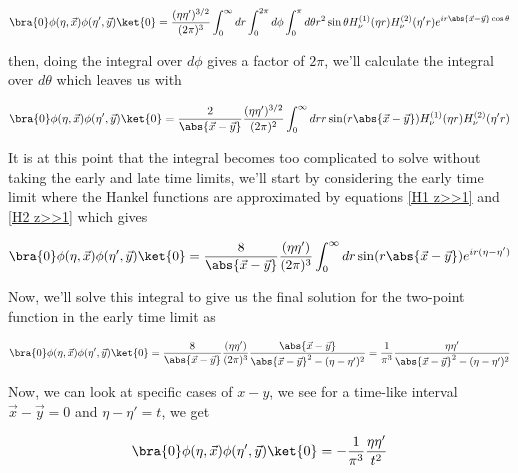 \documentclass[a4paper,11pt]{article}
\numberwithin{equation}{section}
\numberwithin{figure}{section}
\begin{document}
\begin{large}
\begin{equation}
\label{2pointsolsp}    
    \bra{0} \phi(\eta,\Vec{x})\phi(\eta',\Vec{y})\ket{0}=\frac{(\eta\eta')^{3/2}}{(2\pi)^3}\int^\infty_0 dr\int_0^{2\pi} d\phi \int_0^\pi d\theta r^2 \sin \theta H^{(1)}_\nu(\eta r)H^{(2)}_\nu(\eta'r)e^{i r \abs{\Vec{x}-\Vec{y}}\cos\theta}
\end{equation}

then, doing the integral over $d\phi$ gives a factor of $2\pi$, we'll calculate the integral over $d\theta$ which leaves us with

\begin{equation}
\label{2pointsolr}    
    \bra{0} \phi(\eta,\Vec{x})\phi(\eta',\Vec{y})\ket{0}=\frac{2}{\abs{\Vec{x}-\Vec{y}}}\frac{(\eta\eta')^{3/2}}{(2\pi)^2}\int^\infty_0 dr r \sin(r \abs{\Vec{x}-\Vec{y}}) H^{(1)}_\nu(\eta r)H^{(2)}_\nu(\eta'r)
\end{equation}

It is at this point that the integral becomes too complicated to solve without taking the early and late time limits, we'll start by considering the early time limit where the Hankel functions are approximated by equations \eqref{H1 z>>1} and \eqref{H2 z>>1} which gives

\begin{equation}
\label{2pointsol eta>>1}    
    \bra{0} \phi(\eta,\Vec{x})\phi(\eta',\Vec{y})\ket{0}=\frac{8}{\abs{\Vec{x}-\Vec{y}}}\frac{(\eta\eta')}{(2\pi)^3}\int^\infty_0 dr  \sin(r \abs{\Vec{x}-\Vec{y}}) e^{ir(\eta-\eta')} 
\end{equation}

\newpage

Now, we'll solve this integral to give us the final solution for the two-point function in the early time limit as

\begin{equation}
\label{2pointfullsol eta>>1}    
    \bra{0} \phi(\eta,\Vec{x})\phi(\eta',\Vec{y})\ket{0}=\frac{8}{\abs{\Vec{x}-\Vec{y}}}\frac{(\eta\eta')}{(2\pi)^3} \frac{\abs{\Vec{x}-\Vec{y}}}{\abs{\Vec{x}-\Vec{y}}^2-(\eta-\eta')^2}=\frac{1}{\pi^3} \frac{\eta\eta'}{\abs{\Vec{x}-\Vec{y}}^2-(\eta-\eta')^2}
\end{equation}

Now, we can look at specific cases of $x-y$, we see for a time-like interval $\Vec{x}-\Vec{y}=0$ and $\eta-\eta'=t$, we get 

\begin{equation}
\label{2point eta>>1 x-y=0}    
    \bra{0} \phi(\eta,\Vec{x})\phi(\eta',\Vec{y})\ket{0}=-\frac{1}{\pi^3} \frac{\eta\eta'}{t^2}
\end{equation}



\end{large}
\end{document}
